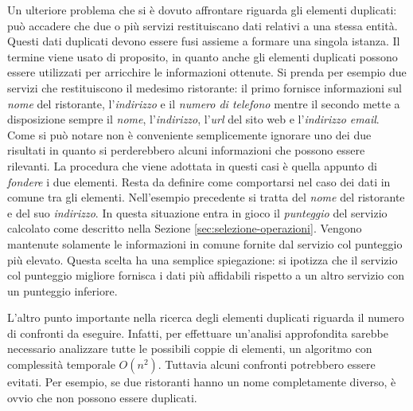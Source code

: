 Un ulteriore problema che si è dovuto affrontare riguarda gli elementi duplicati: può accadere che due o più servizi restituiscano dati relativi a una stessa entità. Questi dati duplicati devono essere fusi assieme a formare una singola istanza. Il termine  viene usato di proposito, in quanto anche gli elementi duplicati possono essere utilizzati per arricchire le informazioni ottenute. Si prenda per esempio due servizi che restituiscono il medesimo ristorante: il primo fornisce informazioni sul \emph{nome} del ristorante, l'\emph{indirizzo} e il \emph{numero di telefono} mentre il secondo mette a disposizione sempre il \emph{nome}, l'\emph{indirizzo}, l'\emph{url} del sito web e l'\emph{indirizzo email}. Come si può notare non è conveniente semplicemente ignorare uno dei due risultati in quanto si perderebbero alcuni informazioni che possono essere rilevanti. La procedura che viene adottata in questi casi è quella appunto di \emph{fondere} i due elementi. Resta da definire come comportarsi nel caso dei dati in comune tra gli elementi. Nell'esempio precedente si tratta del \emph{nome} del ristorante e del suo \emph{indirizzo}. In questa situazione entra in gioco il \emph{punteggio} del servizio calcolato come descritto nella Sezione \ref{sec:selezione-operazioni}. Vengono mantenute solamente le informazioni in comune fornite dal servizio col punteggio più elevato. Questa scelta ha una semplice spiegazione: si ipotizza che il servizio col punteggio migliore fornisca i dati più affidabili rispetto a un altro servizio con un punteggio inferiore.

L'altro punto importante nella ricerca degli elementi duplicati riguarda il numero di confronti da eseguire. Infatti, per effettuare un'analisi approfondita sarebbe necessario analizzare tutte le possibili coppie di elementi, un algoritmo con complessità temporale $ O(n^2) $. Tuttavia alcuni confronti potrebbero essere evitati. Per esempio, se due ristoranti hanno un nome completamente diverso, è ovvio che non possono essere duplicati.

